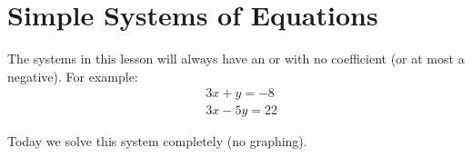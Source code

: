 \section{Simple Systems of Equations}

The systems in this lesson will always have an  or  with 
no coefficient (or at most a negative).
For example:
\begin{align*}
    &3x+y = -8 \\
    &3x - 5y = 22
\end{align*}

%
Today we solve this system completely
 (no graphing).
